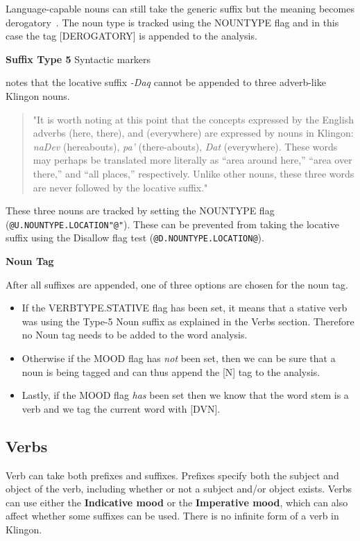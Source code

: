 \documentclass[11pt]{article}
\begin{document}
Language-capable nouns can still take the generic suffix but the meaning becomes derogatory~\cite{Okrand:92}. The noun type is tracked using the NOUNTYPE flag and in this case the tag [DEROGATORY] is appended to the analysis.

\textbf{Suffix Type 5} Syntactic markers

\cite{Okrand:92} notes that the locative suffix \textit{-Daq} cannot be appended to three adverb-like Klingon nouns.

\begin{quote}
"It is worth noting at this point that the concepts expressed by the English adverbs (here, there), and (everywhere) are expressed by nouns in Klingon: \textit{naDev} (hereabouts), \textit{pa'} (there-abouts), \textit{Dat} (everywhere). These words may perhaps be translated more literally as ``area around here,'' ``area over there,'' and ``all places,'' respectively. Unlike other nouns, these three words are never followed by the locative suffix."
\end{quote}

These three nouns are tracked by setting the NOUNTYPE flag (\texttt{@U.NOUNTYPE.LOCATION"@"}). These can be prevented from taking the locative suffix using the Disallow flag test (\texttt{@D.NOUNTYPE.LOCATION@}).

\textbf{Noun Tag}

After all suffixes are appended, one of three options are chosen for the noun tag.

\begin{itemize}
	\item If the VERBTYPE.STATIVE flag has been set, it means that a stative verb was using the Type-5 Noun suffix as explained in the Verbs section. Therefore no Noun tag needs to be added to the word analysis.
	\item Otherwise if the MOOD flag has \textit{not} been set, then we can be sure that a noun is being tagged and can thus append the [N] tag to the analysis.
	\item Lastly, if the MOOD flag \textit{has} been set then we know that the word stem is a verb and we tag the current word with [DVN].
\end{itemize}

\subsection {Verbs}

Verb can take both prefixes and suffixes. Prefixes specify both the subject and object of the verb, including whether or not a subject and/or object exists. Verbs can use either the \textbf{Indicative mood} or the \textbf{Imperative mood}, which can also affect whether some suffixes can be used. There is no infinite form of a verb in Klingon.
\end{document}

